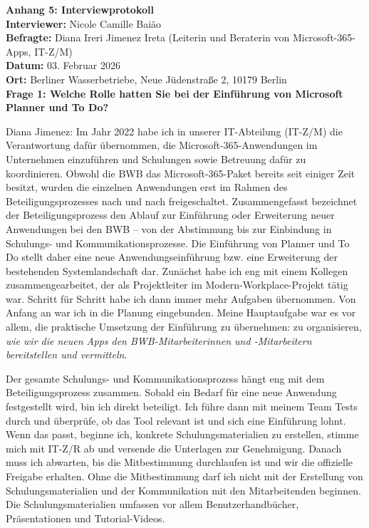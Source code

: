 \documentclass[
    12pt, 
    a4paper,
    ]{scrartcl} %
\begin{document}
\newpage
{}
{}
\label{sec:Anhang5}

{\Large\bfseries Anhang 5: Interviewprotokoll}\\[1em]
\textbf{Interviewer:} Nicole Camille Baião \\
\textbf{Befragte:} Diana Ireri Jimenez Ireta (Leiterin und Beraterin von Microsoft-365-Apps, IT-Z/M) \\
\textbf{Datum:} 03. Februar 2026 \\
\textbf{Ort:} Berliner Wasserbetriebe, Neue Jüdenstraße 2, 10179 Berlin \\

\textbf{Frage 1: Welche Rolle hatten Sie bei der Einführung von Microsoft Planner und To Do?}

Diana Jimenez: Im Jahr 2022 habe ich in unserer IT-Abteilung (IT-Z/M) die Verantwortung dafür übernommen, die Microsoft-365-Anwendungen im Unternehmen einzuführen und Schulungen sowie Betreuung dafür zu koordinieren. Obwohl die BWB das Microsoft-365-Paket bereits seit einiger Zeit besitzt, wurden die einzelnen Anwendungen erst im Rahmen des Beteiligungsprozesses nach und nach freigeschaltet. Zusammengefasst bezeichnet der Beteiligungsprozess den Ablauf zur Einführung oder Erweiterung neuer Anwendungen bei den BWB – von der Abstimmung bis zur Einbindung in Schulungs- und Kommunikationsprozesse. Die Einführung von Planner und To Do stellt daher eine neue Anwendungseinführung bzw. eine Erweiterung der bestehenden Systemlandschaft dar. Zunächst habe ich eng mit einem Kollegen zusammengearbeitet, der als Projektleiter im Modern-Workplace-Projekt tätig war. Schritt für Schritt habe ich dann immer mehr Aufgaben übernommen. Von Anfang an war ich in die Planung eingebunden. Meine Hauptaufgabe war es vor allem, die praktische Umsetzung der Einführung zu übernehmen: zu organisieren, \textit{wie wir die neuen Apps den BWB-Mitarbeiterinnen und -Mitarbeitern bereitstellen und vermitteln}.

Der gesamte Schulungs- und Kommunikationsprozess hängt eng mit dem Beteiligungsprozess zusammen. Sobald ein Bedarf für eine neue Anwendung festgestellt wird, bin ich direkt beteiligt. Ich führe dann mit meinem Team Tests durch und überprüfe, ob das Tool relevant ist und sich eine Einführung lohnt. Wenn das passt, beginne ich, konkrete Schulungsmaterialien zu erstellen, stimme mich mit IT-Z/R ab und versende die Unterlagen zur Genehmigung. Danach muss ich abwarten, bis die Mitbestimmung durchlaufen ist und wir die offizielle Freigabe erhalten. Ohne die Mitbestimmung darf ich nicht mit der Erstellung von Schulungsmaterialien und der Kommunikation mit den Mitarbeitenden beginnen. Die Schulungsmaterialien umfassen vor allem Benutzerhandbücher, Präsentationen und Tutorial-Videos. 
\end{document}
